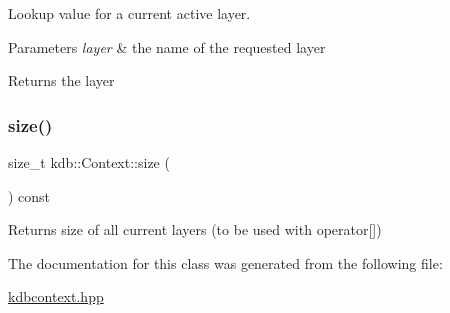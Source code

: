 Lookup value for a current active layer. 


\begin{DoxyParams}{Parameters}
{\em layer} & the name of the requested layer \\
\hline
\end{DoxyParams}
\begin{DoxyReturn}{Returns}
the layer 
\end{DoxyReturn}
\mbox{\label{classkdb_1_1Context_a2208d178203f74652a2a023b66d445fd}} 
\subsubsection{\texorpdfstring{size()}{size()}}
{\footnotesize\ttfamily size\+\_\+t kdb\+::\+Context\+::size (\begin{DoxyParamCaption}{ }\end{DoxyParamCaption}) const\hspace{0.3cm}{\ttfamily [inline]}}

\begin{DoxyReturn}{Returns}
size of all current layers (to be used with operator\mbox{[}\mbox{]}) 
\end{DoxyReturn}


The documentation for this class was generated from the following file\+:\begin{DoxyCompactItemize}
\item 
\mbox{\hyperlink{kdbcontext_8hpp}{kdbcontext.\+hpp}}\end{DoxyCompactItemize}
